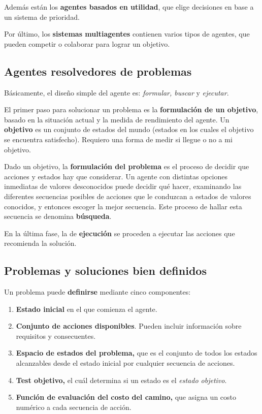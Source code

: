 \documentclass[10pt,a4paper]{article}
\begin{document}
Además están los \textbf{agentes basados en utilidad}, que elige decisiones en base a un sistema de prioridad.

Por último, los \textbf{sistemas multiagentes} contienen varios tipos de agentes, que pueden competir o colaborar para lograr un objetivo.

\subsection{Agentes resolvedores de problemas}

Básicamente, el diseño simple del agente es: \textit{formular, buscar} y \textit{ejecutar}.

El primer paso para solucionar un problema es la \textbf{formulación de un objetivo}, basado en la situación actual y la medida de rendimiento del agente. Un \textbf{objetivo} es un conjunto de estados del mundo (estados en los cuales el objetivo se encuentra satisfecho). Requiero una forma de medir si llegue o no a mi objetivo.

Dado un objetivo, la \textbf{formulación del problema} es el proceso de decidir que acciones y estados hay que considerar. Un agente con distintas opciones inmediatas de valores desconocidos puede decidir qué hacer, examinando las diferentes secuencias posibles de acciones que le conduzcan a estados de valores conocidos, y entonces escoger la mejor secuencia. Este proceso de hallar esta secuencia se denomina \textbf{búsqueda}.


En la última fase, la de \textbf{ejecución} se proceden a ejecutar las acciones que recomienda la solución.

\subsection{Problemas y soluciones bien definidos}

Un problema puede \textbf{definirse} mediante cinco componentes:
\begin{enumerate}
\item \textbf{Estado inicial} en el que comienza el agente.
\item \textbf{Conjunto de acciones disponibles}. Pueden incluir información sobre requisitos y consecuentes.
\item \textbf{Espacio de estados del problema,} que es el conjunto de todos los estados alcanzables desde el estado inicial por cualquier secuencia de acciones.
\item \textbf{Test objetivo,} el cuál determina si un estado es el \textit{estado objetivo}.
\item \textbf{Función de evaluación del costo del camino,} que asigna un costo numérico a cada secuencia de acción.
\end{enumerate}
\end{document}
